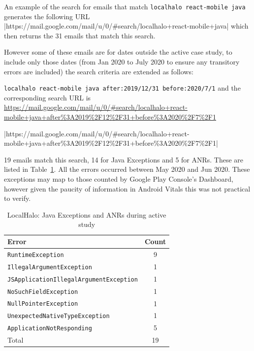 
An example of the search for emails that match \texttt{localhalo react-mobile java} generates the following URL |https://mail.google.com/mail/u/0/#search/localhalo+react-mobile+java| which then returns the 31 emails that match this search. 

However some of these emails are for dates outside the active case study, to include only those dates (from  Jan 2020 to  July 2020 to ensure any transitory errors are included) the search criteria are extended as follows: 

\texttt{localhalo react-mobile java after:2019/12/31 before:2020/7/1} and the corresponding search URL is \url{https://mail.google.com/mail/u/0/#search/localhalo+react-mobile+java+after\%3A2019\%2F12\%2F31+before\%3A2020\%2F7\%2F1}

|https://mail.google.com/mail/u/0/#search/localhalo+react-mobile+java+after\%3A2019\%2F12\%2F31+before\%3A2020\%2F7\%2F1|

19 emails match this search, 14 for Java Exceptions and 5 for ANRs. These are listed in Table~\ref{tab:localhalo-sentry-java-errors-during-active-study}. All the errors occurred between  May 2020 and  Jun 2020. %
These exceptions may map to those counted by Google Play Console's Dashboard, however given the paucity of information in Android Vitals this was not practical to verify. 


\begin{table}
    \centering
    \footnotesize
    \captionsetup{font=scriptsize}
    \begin{tabular}{lc}
      Error  &  Count \\
      \toprule
      \texttt{RuntimeException} & 9 \\
      \texttt{IllegalArgumentException} & 1 \\
      \texttt{JSApplicationIllegalArgumentException} & 1 \\
      \texttt{NoSuchFieldException} &1 \\
      \texttt{NullPointerException} & 1 \\
      \texttt{UnexpectedNativeTypeException}  & 1 \\
      \midrule
      \texttt{ApplicationNotResponding} & 5 \\
      \midrule
      Total & 19 \\
      \bottomrule
    \end{tabular}
    \caption{LocalHalo: Java Exceptions and ANRs during active study}
    \label{tab:localhalo-sentry-java-errors-during-active-study}
\end{table}


